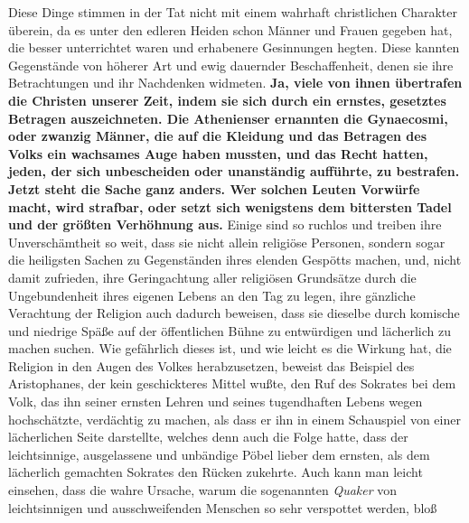 Diese Dinge stimmen in der Tat nicht mit einem wahrhaft christlichen Charakter
überein, da es unter den edleren Heiden schon Männer und
Frauen gegeben hat, die
besser unterrichtet waren und erhabenere Gesinnungen hegten. Diese kannten
Gegenstände von höherer Art und ewig dauernder Beschaffenheit, denen sie ihre
Betrachtungen und ihr Nachdenken widmeten. 
\label{ref:17_08_sittenwaechter}
\textbf{Ja, viele von ihnen übertrafen die
Christen unserer Zeit, indem sie sich durch ein ernstes, gesetztes Betragen
auszeichneten. Die Athenienser ernannten die Gynaecosmi, oder zwanzig Männer,
die auf die Kleidung und das Betragen des Volks ein wachsames Auge haben
mussten,
und das Recht hatten, jeden, der sich unbescheiden oder unanständig aufführte,
zu bestrafen. Jetzt steht die Sache ganz anders. Wer solchen Leuten
Vorwürfe macht, wird strafbar, oder setzt sich wenigstens dem bittersten Tadel
und der größten Verhöhnung aus.} Einige sind so ruchlos und treiben ihre
Unverschämtheit so weit, dass sie nicht allein religiöse Personen, sondern sogar
die heiligsten Sachen zu Gegenständen ihres elenden Gespötts machen, und, nicht
damit zufrieden, ihre Geringachtung aller religiösen Grundsätze durch die
Ungebundenheit ihres eigenen Lebens an den Tag zu legen, ihre gänzliche
Verachtung der Religion auch dadurch beweisen, dass sie dieselbe durch komische
und niedrige Späße auf der öffentlichen Bühne zu entwürdigen und lächerlich zu
machen suchen. Wie gefährlich dieses ist, und wie leicht es die Wirkung hat, die
Religion in den Augen des Volkes herabzusetzen, beweist das Beispiel des
Aristophanes, der kein geschickteres Mittel wußte,
den Ruf des Sokrates bei dem
Volk, das ihn seiner ernsten Lehren und seines tugendhaften Lebens wegen
hochschätzte, verdächtig zu machen, als dass er ihn in einem Schauspiel von
einer lächerlichen Seite darstellte, welches denn auch die Folge hatte, dass der
leichtsinnige, ausgelassene und unbändige Pöbel lieber
dem ernsten, als dem
lächerlich gemachten Sokrates den Rücken zukehrte. Auch kann man leicht
einsehen, dass die wahre Ursache, warum die sogenannten
\textit{Quaker} von
leichtsinnigen und ausschweifenden Menschen so sehr verspottet werden, bloß
